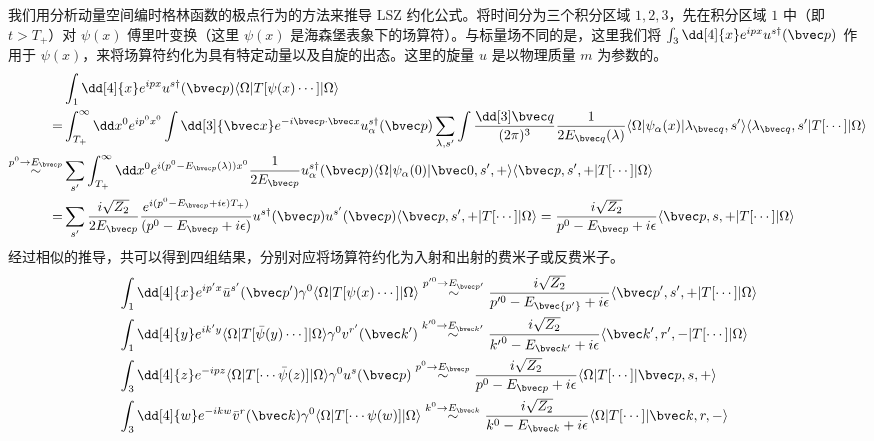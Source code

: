 

我们用分析动量空间编时格林函数的极点行为的方法来推导 LSZ 约化公式。将时间分为三个积分区域 $1,2,3$，先在积分区域 $1$ 中（即 $t>T_+$）对 $\psi(x)$ 傅里叶变换（这里 $\psi(x)$ 是海森堡表象下的场算符）。与标量场不同的是，这里我们将 $\int_{3} \dd[4]{x} e^{ipx} u^{s\dagger}(\bvec p)$ 作用于 $\psi(x)$，来将场算符约化为具有特定动量以及自旋的出态。这里的旋量 $u$ 是以物理质量 $m$ 为参数的。
\begin{equation}
\begin{aligned}
&\int_{1} \dd[4]{x} e^{ipx} u^{s\dagger}(\bvec p)\langle \Omega|T[\psi(x)\cdots]|\Omega\rangle\\
=&\int_{T_+}^\infty \dd x^0 e^{ip^0x^0}\int \dd[3]{\bvec x} e^{-i\bvec p\cdot \bvec x} u^{s\dagger}_\alpha(\bvec p)
\sum_{\lambda, s'}\int \frac{\dd[3] \bvec q}{(2\pi)^3} \frac{1}{2E_{\bvec q}(\lambda)}\langle \Omega|\psi_\alpha(x)|\lambda_{\bvec q},s'\rangle \langle \lambda_{\bvec q},s'| T[\cdots]|\Omega\rangle\\
\stackrel{p^0\rightarrow E_{\bvec p}}{\sim}
&
\sum_{s'}\int_{T_+}^\infty \dd x^0 e^{i(p^0-E_{\bvec p}(\lambda))x^0}
\frac{1}{2E_{\bvec p}} u^{s\dagger}_\alpha(\bvec p)\langle \Omega|\psi_\alpha(0)|\bvec 0,s',+\rangle\langle \bvec p,s',+| T[\cdots]|\Omega\rangle\\
=&\sum_{s'}\frac{i\sqrt{Z_2}}{2E_{\bvec p}}\frac{e^{i(p^0-E_{\bvec p}+i\epsilon)T_+)}}{(p^0-E_{\bvec p}+i\epsilon)} u^{s\dagger}(\bvec p)u^{s'}(\bvec p)\langle \bvec p,s',+| T[\cdots]|\Omega\rangle= \frac{i\sqrt{Z_2}}{p^0-E_{\bvec p}+i\epsilon} \langle \bvec p,s,+| T[\cdots]|\Omega\rangle
\end{aligned}
\end{equation}
经过相似的推导，共可以得到四组结果，分别对应将场算符约化为入射和出射的费米子或反费米子。
\begin{equation}
\begin{aligned}
&\int_{ 1} \dd[4]{x} e^{ip'x} \bar{u}^{s'}(\bvec p')\gamma^0\langle \Omega|T[\psi(x)\cdots]|\Omega\rangle
\stackrel{p'^0\rightarrow E_{\bvec p'}}{\sim}
\frac{i\sqrt{Z_2}}{p'^0-E_{\bvec {p'}}+i\epsilon} \langle \bvec p',s',+| T[\cdots]|\Omega\rangle\\
&
\int_{ 1} \dd[4]{y} e^{ik'y} \langle \Omega|T[\bar{\psi}(y)\cdots]|\Omega\rangle \gamma^0 v^{r'}(\bvec k')
\stackrel{k'^0\rightarrow E_{\bvec k'}}{\sim}
\frac{i\sqrt{Z_2}}{{k'}^0-E_{\bvec k'}+i\epsilon} \langle \bvec k',r',-| T[\cdots]|\Omega\rangle\\
&
\int_{ 3} \dd[4]{z} e^{-ipz}
\langle \Omega|T[\cdots\bar{\psi}(z)]| \Omega\rangle\gamma^0  u^{s}(\bvec p)
\stackrel{p^0\rightarrow E_{\bvec p}}{\sim}
\frac{i\sqrt{Z_2}}{p^0-E_{\bvec p}+i\epsilon} \langle \Omega| T[\cdots]|\bvec p,s,+\rangle\\
&
\int_{ 3} \dd[4]{w} e^{-ikw}
\bar{v}^{r}(\bvec k)\gamma^0\langle \Omega|T[\cdots\psi(w)]| \Omega\rangle  
\stackrel{k^0\rightarrow E_{\bvec k}}{\sim}
\frac{i\sqrt{Z_2}}{k^0-E_{\bvec k}+i\epsilon} \langle \Omega| T[\cdots]|\bvec k,r,-\rangle
\end{aligned}
\end{equation}
